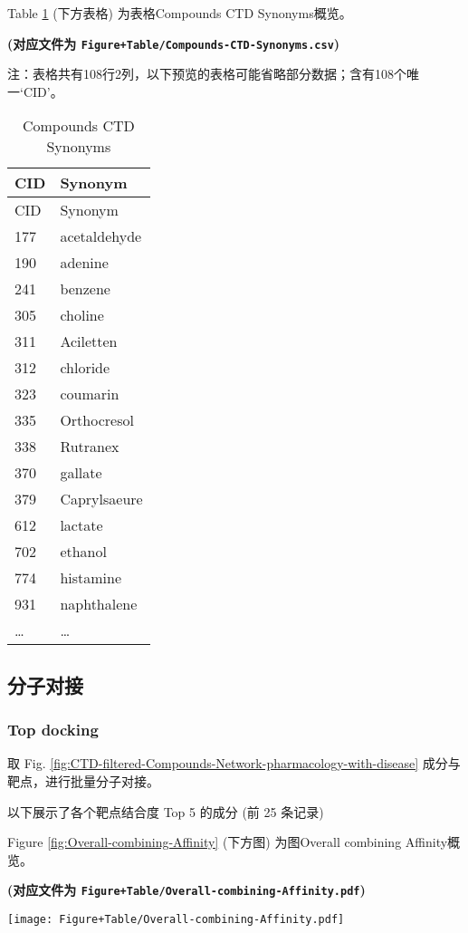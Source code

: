 \documentclass[
]{article}
\begin{document}
Table \ref{tab:Compounds-CTD-Synonyms} (下方表格) 为表格Compounds CTD Synonyms概览。

\textbf{(对应文件为 \texttt{Figure+Table/Compounds-CTD-Synonyms.csv})}

\begin{center}\begin{tcolorbox}[colback=gray!10, colframe=gray!50, width=0.9\linewidth, arc=1mm, boxrule=0.5pt]注：表格共有108行2列，以下预览的表格可能省略部分数据；含有108个唯一`CID'。
\end{tcolorbox}
\end{center}

\begin{longtable}[]{@{}ll@{}}
\caption{\label{tab:Compounds-CTD-Synonyms}Compounds CTD Synonyms}\tabularnewline
\toprule
CID & Synonym\tabularnewline
\midrule
\endfirsthead
\toprule
CID & Synonym\tabularnewline
\midrule
\endhead
177 & acetaldehyde\tabularnewline
190 & adenine\tabularnewline
241 & benzene\tabularnewline
305 & choline\tabularnewline
311 & Aciletten\tabularnewline
312 & chloride\tabularnewline
323 & coumarin\tabularnewline
335 & Orthocresol\tabularnewline
338 & Rutranex\tabularnewline
370 & gallate\tabularnewline
379 & Caprylsaeure\tabularnewline
612 & lactate\tabularnewline
702 & ethanol\tabularnewline
774 & histamine\tabularnewline
931 & naphthalene\tabularnewline
\ldots{} & \ldots{}\tabularnewline
\bottomrule
\end{longtable}

\hypertarget{ux5206ux5b50ux5bf9ux63a5}{%
\subsection{分子对接}\label{ux5206ux5b50ux5bf9ux63a5}}

\hypertarget{top-docking}{%
\subsubsection{Top docking}\label{top-docking}}

取 Fig. \ref{fig:CTD-filtered-Compounds-Network-pharmacology-with-disease} 成分与靶点，进行批量分子对接。

以下展示了各个靶点结合度 Top 5 的成分 (前 25 条记录)

Figure \ref{fig:Overall-combining-Affinity} (下方图) 为图Overall combining Affinity概览。

\textbf{(对应文件为 \texttt{Figure+Table/Overall-combining-Affinity.pdf})}

\def\@captype{figure}
\begin{center}
\texttt{[image: Figure+Table/Overall-combining-Affinity.pdf]}
\caption{Overall combining Affinity}\label{fig:Overall-combining-Affinity}
\end{center}
\end{document}
